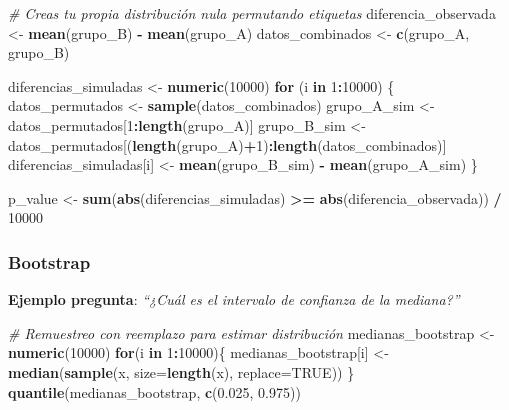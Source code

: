 \documentclass[
  10pt,
]{article}
\newenvironment{Shaded}{\begin{snugshade}}{\end{snugshade}}
\newcommand{\AttributeTok}[1]{\textcolor[rgb]{0.13,0.29,0.53}{#1}}
\newcommand{\CommentTok}[1]{\textcolor[rgb]{0.56,0.35,0.01}{\textit{#1}}}
\newcommand{\ConstantTok}[1]{\textcolor[rgb]{0.56,0.35,0.01}{#1}}
\newcommand{\ControlFlowTok}[1]{\textcolor[rgb]{0.13,0.29,0.53}{\textbf{#1}}}
\newcommand{\DecValTok}[1]{\textcolor[rgb]{0.00,0.00,0.81}{#1}}
\newcommand{\FloatTok}[1]{\textcolor[rgb]{0.00,0.00,0.81}{#1}}
\newcommand{\FunctionTok}[1]{\textcolor[rgb]{0.13,0.29,0.53}{\textbf{#1}}}
\newcommand{\NormalTok}[1]{#1}
\newcommand{\OtherTok}[1]{\textcolor[rgb]{0.56,0.35,0.01}{#1}}
\newcommand{\SpecialCharTok}[1]{\textcolor[rgb]{0.81,0.36,0.00}{\textbf{#1}}}
\begin{document}
\begin{Shaded}
\begin{Highlighting}[]
\CommentTok{\# Creas tu propia distribución nula permutando etiquetas}
\NormalTok{diferencia\_observada }\OtherTok{\textless{}{-}} \FunctionTok{mean}\NormalTok{(grupo\_B) }\SpecialCharTok{{-}} \FunctionTok{mean}\NormalTok{(grupo\_A)}
\NormalTok{datos\_combinados }\OtherTok{\textless{}{-}} \FunctionTok{c}\NormalTok{(grupo\_A, grupo\_B)}

\NormalTok{diferencias\_simuladas }\OtherTok{\textless{}{-}} \FunctionTok{numeric}\NormalTok{(}\DecValTok{10000}\NormalTok{)}
\ControlFlowTok{for}\NormalTok{ (i }\ControlFlowTok{in} \DecValTok{1}\SpecialCharTok{:}\DecValTok{10000}\NormalTok{) \{}
\NormalTok{  datos\_permutados }\OtherTok{\textless{}{-}} \FunctionTok{sample}\NormalTok{(datos\_combinados)}
\NormalTok{  grupo\_A\_sim }\OtherTok{\textless{}{-}}\NormalTok{ datos\_permutados[}\DecValTok{1}\SpecialCharTok{:}\FunctionTok{length}\NormalTok{(grupo\_A)]}
\NormalTok{  grupo\_B\_sim }\OtherTok{\textless{}{-}}\NormalTok{ datos\_permutados[(}\FunctionTok{length}\NormalTok{(grupo\_A)}\SpecialCharTok{+}\DecValTok{1}\NormalTok{)}\SpecialCharTok{:}\FunctionTok{length}\NormalTok{(datos\_combinados)]}
\NormalTok{  diferencias\_simuladas[i] }\OtherTok{\textless{}{-}} \FunctionTok{mean}\NormalTok{(grupo\_B\_sim) }\SpecialCharTok{{-}} \FunctionTok{mean}\NormalTok{(grupo\_A\_sim)}
\NormalTok{\}}

\NormalTok{p\_value }\OtherTok{\textless{}{-}} \FunctionTok{sum}\NormalTok{(}\FunctionTok{abs}\NormalTok{(diferencias\_simuladas) }\SpecialCharTok{\textgreater{}=} \FunctionTok{abs}\NormalTok{(diferencia\_observada)) }\SpecialCharTok{/} \DecValTok{10000}
\end{Highlighting}
\end{Shaded}

\subsubsection{Bootstrap}\label{bootstrap}

\textbf{Ejemplo pregunta}: \emph{``¿Cuál es el intervalo de confianza de
la mediana?''}

\begin{Shaded}
\begin{Highlighting}[]
\CommentTok{\# Remuestreo con reemplazo para estimar distribución}
\NormalTok{medianas\_bootstrap }\OtherTok{\textless{}{-}} \FunctionTok{numeric}\NormalTok{(}\DecValTok{10000}\NormalTok{)}
\ControlFlowTok{for}\NormalTok{(i }\ControlFlowTok{in} \DecValTok{1}\SpecialCharTok{:}\DecValTok{10000}\NormalTok{)\{}
\NormalTok{  medianas\_bootstrap[i] }\OtherTok{\textless{}{-}} \FunctionTok{median}\NormalTok{(}\FunctionTok{sample}\NormalTok{(x, }\AttributeTok{size=}\FunctionTok{length}\NormalTok{(x), }\AttributeTok{replace=}\ConstantTok{TRUE}\NormalTok{))}
\NormalTok{\}}
\FunctionTok{quantile}\NormalTok{(medianas\_bootstrap, }\FunctionTok{c}\NormalTok{(}\FloatTok{0.025}\NormalTok{, }\FloatTok{0.975}\NormalTok{))}
\end{Highlighting}
\end{Shaded}
\end{document}
